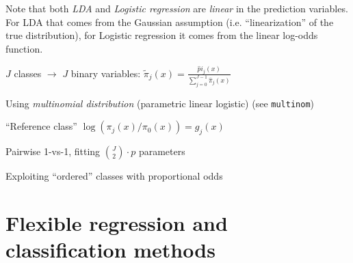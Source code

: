 \begin{notebox}\nospacing{}
  Note that both \emph{LDA} and \emph{Logistic regression} are \emph{linear} in the prediction variables.
  For LDA that comes from the Gaussian assumption (i.e. ``linearization'' of the true distribution), for Logistic regression it comes from the linear log-odds function.
\end{notebox}
\begin{notebox}\nospacing{}
  \begin{enumeratenosep}
  \item $J$ classes $\rightarrow$ $J$ binary variables: $\tilde \pi_j(x) = \frac{\hat pi_j(x)}{\sum_{j=0}^{J-1}\hat\pi_j(x)}$
  \item Using \emph{multinomial distribution} (parametric linear logistic) (see \verb!multinom!)
  \item ``Reference class'' $\log(\pi_j(x)/\pi_0(x)) = g_j(x)$
  \item Pairwise 1-vs-1, fitting ${J \choose 2}\cdot p$ parameters
  \item Exploiting ``ordered'' classes with proportional odds
  \end{enumeratenosep}
\end{notebox}


\section{Flexible regression and classification methods}\label{sec:flexible_regression_and_classification_methods}

